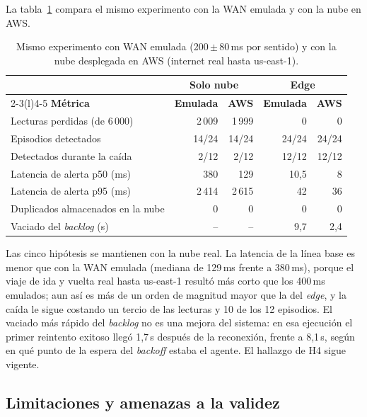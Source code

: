 La tabla~\ref{tab:resultados-aws} compara el mismo experimento con la WAN
emulada y con la nube en AWS.

\begin{table}[htbp]
\centering
\caption{Mismo experimento con WAN emulada (200\,$\pm$\,80\,ms por sentido) y con
la nube desplegada en AWS (internet real hasta us-east-1).}
\label{tab:resultados-aws}
\small
\begin{tabular}{@{}lrrrr@{}}
\toprule
& \multicolumn{2}{c}{\textbf{Solo nube}} & \multicolumn{2}{c}{\textbf{Edge}} \\
\cmidrule(lr){2-3}\cmidrule(l){4-5}
\textbf{Métrica} & \textbf{Emulada} & \textbf{AWS} & \textbf{Emulada} & \textbf{AWS} \\
\midrule
Lecturas perdidas (de 6\,000) & 2\,009 & 1\,999 & 0 & 0 \\
Episodios detectados & 14/24 & 14/24 & 24/24 & 24/24 \\
Detectados durante la caída & 2/12 & 2/12 & 12/12 & 12/12 \\
Latencia de alerta p50 (ms) & 380 & 129 & 10,5 & 8 \\
Latencia de alerta p95 (ms) & 2\,414 & 2\,615 & 42 & 36 \\
Duplicados almacenados en la nube & 0 & 0 & 0 & 0 \\
Vaciado del \emph{backlog} (s) & -- & -- & 9,7 & 2,4 \\
\bottomrule
\end{tabular}
\end{table}

Las cinco hipótesis se mantienen con la nube real. La latencia de la línea base
es menor que con la WAN emulada (mediana de 129\,ms frente a 380\,ms), porque el
viaje de ida y vuelta real hasta us-east-1 resultó más corto que los 400\,ms
emulados; aun así es más de un orden de magnitud mayor que la del \emph{edge},
y la caída le sigue costando un tercio de las lecturas y 10 de los 12
episodios. El vaciado más rápido del \emph{backlog} no es una mejora del
sistema: en esa ejecución el primer reintento exitoso llegó 1,7\,s después de
la reconexión, frente a 8,1\,s, según en qué punto de la espera del
\emph{backoff} estaba el agente. El hallazgo de H4 sigue vigente.

\subsection{Limitaciones y amenazas a la validez}

